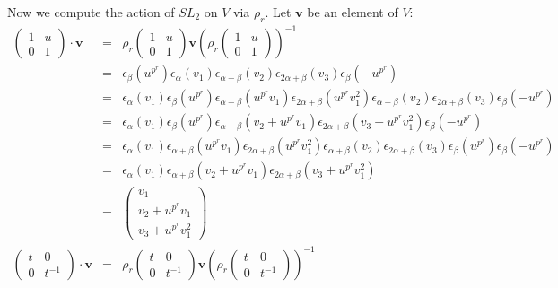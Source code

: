 Now we compute the action of $SL_2$ on $V$ via $\rho_r$. Let $\mathbf{v}$ be an element of $V$:
\begin{eqnarray*}
\left(\begin{matrix} 1 & u \\ 0 & 1\end{matrix}\right) \cdot \mathbf{v} &=& \rho_r\left(\begin{matrix} 1 & u \\ 0 & 1\end{matrix}\right) \mathbf{v}\left( \rho_r\left(\begin{matrix} 1 & u \\ 0 & 1\end{matrix}\right)\right)^{-1} \\
&=&\epsilon_\beta (u^{p^r}) \epsilon_\alpha (v_1)\epsilon_{\alpha+\beta}(v_2) \epsilon_{2\alpha+\beta}(v_3) \epsilon_\beta (-u^{p^r}) \\
&=&\epsilon_\alpha (v_1) \epsilon_\beta (u^{p^r}) \epsilon_{\alpha+\beta}(u^{p^r}v_1) \epsilon_{2\alpha+\beta}(u^{p^r}v_1^2) \epsilon_{\alpha+\beta}(v_2) \epsilon_{2\alpha+\beta}(v_3) \epsilon_\beta (-u^{p^r})  \\
&=&\epsilon_\alpha (v_1) \epsilon_\beta (u^{p^r}) \epsilon_{\alpha+\beta}(v_2 + u^{p^r}v_1) \epsilon_{2\alpha+\beta}(v_3 + u^{p^r}v_1^2)  \epsilon_\beta (-u^{p^r})  \\
&=&\epsilon_\alpha (v_1) \epsilon_{\alpha+\beta}(u^{p^r}v_1) \epsilon_{2\alpha+\beta}(u^{p^r}v_1^2) \epsilon_{\alpha+\beta}(v_2) \epsilon_{2\alpha+\beta}(v_3)\epsilon_\beta (u^{p^r})  \epsilon_\beta (-u^{p^r})  \\
&=&\epsilon_\alpha (v_1)  \epsilon_{\alpha+\beta}(v_2 + u^{p^r}v_1) \epsilon_{2\alpha+\beta}(v_3 + u^{p^r}v_1^2) \\
&=& \left(\begin{matrix} v_1 \\ v_2 + u^{p^r}v_1\\ v_3 + u^{p^r}v_1^2 \end{matrix}\right)\\
\left(\begin{matrix} t & 0 \\ 0 & t^{-1}\end{matrix}\right) \cdot \mathbf{v} &=&
\rho_r\left(\begin{matrix} t & 0 \\ 0 & t^{-1}\end{matrix}\right) \mathbf{v}\left( \rho_r\left(\begin{matrix} t & 0 \\ 0 & t^{-1}\end{matrix}\right)\right)^{-1} \\

\end{eqnarray*}
